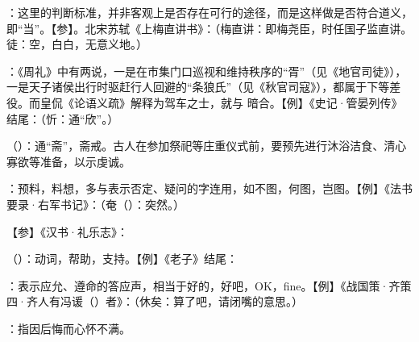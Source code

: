 {
\item {}：这里的判断标准，并非客观上是否存在可行的途径，而是这样做是否符合道义，即“当”。【参】。北宋苏轼《上梅直讲书》：（梅直讲：即梅尧臣，时任国子监直讲。徒：空，白白，无意义地。）
\item {}：《周礼》中有两说，一是在市集门口巡视和维持秩序的“胥”（见《地官司徒》），一是天子诸侯出行时驱赶行人回避的“条狼氏”（见《秋官司寇》），都属于下等差役。而皇侃《论语义疏》解释为驾车之士，就与  暗合。【例】《史记·管晏列传》结尾：（忻：通“欣”。）
}
{}


{
\item {}（）：通“斋”，斋戒。古人在参加祭祀等庄重仪式前，要预先进行沐浴洁食、清心寡欲等准备，以示虔诚。
}
{}


{
\item {}：预料，料想，多与表示否定、疑问的字连用，如不图，何图，岂图。【例】《法书要录·右军书记》：（奄（）：突然。）%

【参】《汉书·礼乐志》：
}
{}


{
\item {}（）：动词，帮助，支持。【例】《老子》结尾：
\item {}：表示应允、遵命的答应声，相当于好的，好吧，OK，fine。【例】《战国策·齐策四·齐人有冯谖（）者》：（休矣：算了吧，请闭嘴的意思。）
\item {}：指因后悔而心怀不满。
}
{}  %


